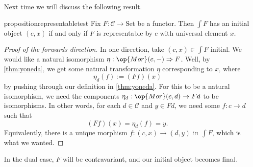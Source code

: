 Next time we will discuss the following result.
\begin{restatable}{proposition}{representabletest} \label{prop:representabletest}
	Fix $F:\mathcal C\to\mathrm{Set}$ be a functor. Then $\int F$ has an initial object $(c,x)$ if and only if $F$ is representable by $c$ with universal element $x$.
\end{restatable}
\begin{proof}[Proof of the forwards direction]
	In one direction, take $(c,x)\in\int F$ initial. We would like a natural isomorphism $\eta:\op{Mor}(c,-)\Rightarrow F$. Well, by \autoref{thm:yoneda}, we get some natural transformation $\eta$ corresponding to $x$, where
	\[\eta_d(f):=(Ff)(x)\]
	by pushing through our definition in \autoref{thm:yoneda}. For this to be a natural isomorphism, we need the components $\eta_d:\op{Mor}(c,d)\to Fd$ to be isomorphisms. In other words, for each $d\in\mathcal C$ and $y\in Fd$, we need some $f:c\to d$ such that
	\[(Ff)(x)=\eta_d(f)=y.\]
	Equivalently, there is a unique morphism $f:(c,x)\to(d,y)$ in $\int F$, which is what we wanted.
\end{proof}
\begin{remark}
	In the dual case, $F$ will be contravariant, and our initial object becomes final.
\end{remark}